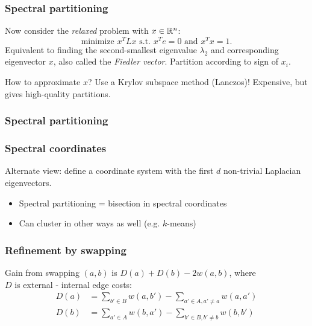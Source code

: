 \documentclass{beamer}
\begin{document}
\begin{frame}
  \frametitle{Spectral partitioning}

  Now consider the {\em relaxed} problem with $x \in \bbR^n$:
  \[
    \mbox{minimize } x^T L x \mbox{ s.t. } x^T e = 0 \mbox{ and } x^T x = 1.
  \]
  Equivalent to finding the second-smallest eigenvalue $\lambda_2$
  and corresponding eigenvector $x$, also called the {\em Fiedler vector}.
  Partition according to sign of $x_i$.

  \vspace{5mm}
  How to approximate $x$?  Use a Krylov subspace method (Lanczos)!
  Expensive, but gives high-quality partitions.
\end{frame}


\begin{frame}
  \frametitle{Spectral partitioning}

  \begin{center}
    \begin{tikzpicture}
      
    \end{tikzpicture}
  \end{center}
\end{frame}


\begin{frame}
  \frametitle{Spectral coordinates}

  \begin{center}
    \begin{tikzpicture}[scale=0.7]
      
    \end{tikzpicture}
  \end{center}
  
  Alternate view: define a coordinate system with the first $d$
  non-trivial Laplacian eigenvectors.
  \begin{itemize}
  \item Spectral partitioning = bisection in spectral coordinates
  \item Can cluster in other ways as well (e.g. $k$-means)
  \end{itemize}
  
\end{frame}


\begin{frame}
  \frametitle{Refinement by swapping}

  \begin{center}
    \begin{tikzpicture}[scale=0.6]
      
    \end{tikzpicture}
  \end{center}
  Gain from swapping $(a,b)$ is $D(a) + D(b) - 2w(a,b)$, where \\
  $D$ is external - internal edge costs:
  \begin{align*}
    D(a) &= \sum_{b' \in B} w(a,b') - \sum_{a' \in A, a' \neq a} w(a,a') \\
    D(b) &= \sum_{a' \in A} w(b,a') - \sum_{b' \in B, b' \neq b} w(b,b') 
  \end{align*}
\end{frame}
\end{document}

